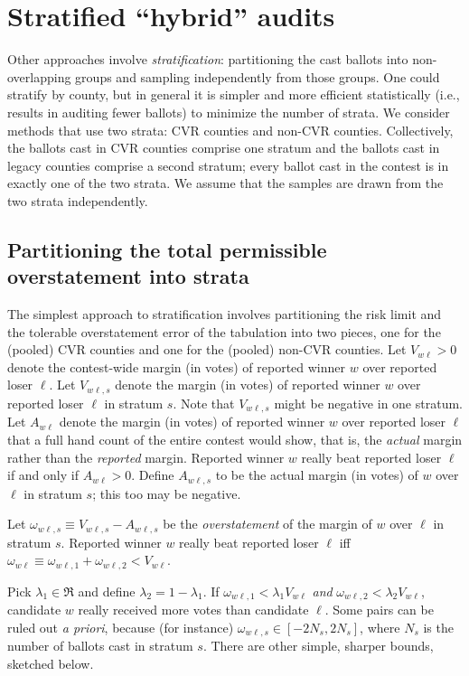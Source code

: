 \documentclass[12pt]{article}
\begin{document}
\section{Stratified ``hybrid'' audits}

Other approaches involve \emph{stratification}: partitioning the cast ballots
into non-overlapping groups and sampling independently from those groups.
One could stratify by county, but in general it is simpler and more efficient
statistically (i.e., results in auditing fewer ballots) to minimize the number of strata.
We consider methods that use two strata: CVR counties and non-CVR counties. 
Collectively, the ballots cast in CVR counties comprise one stratum and the ballots cast in 
legacy counties comprise a second stratum; every ballot cast in the contest is in 
exactly one of the two strata. 
We assume that the samples are drawn from the
two strata independently.

\subsection{Partitioning the total permissible overstatement into strata}
The simplest approach to stratification involves partitioning the risk limit and the tolerable
overstatement error of the tabulation into
two pieces, one for the (pooled) CVR counties and one for the (pooled) non-CVR counties.
Let $V_{w\ell} > 0$ denote the contest-wide margin (in votes) of reported winner 
$w$ over reported loser
$\ell$.
Let $V_{w\ell,s}$ denote the margin (in votes) of reported winner $w$ over reported loser $\ell$
in stratum $s$. 
Note that $V_{w\ell,s}$ might be negative in one stratum.
Let $A_{w\ell}$ denote the margin (in votes)
of reported winner $w$ over reported loser $\ell$ that 
a full hand count of the entire contest would show, that is, the \emph{actual} margin rather
than the \emph{reported} margin.
Reported winner $w$ really beat reported loser $\ell$ if and only if $A_{w\ell} > 0$.
Define $A_{w\ell,s}$ to be the actual margin (in votes) of $w$ over $\ell$ in stratum $s$;
this too may be negative.

Let $\omega_{w\ell,s} \equiv V_{w\ell,s} - A_{w\ell,s}$ be the \emph{overstatement}
of the margin of $w$ over $\ell$ in stratum $s$.
Reported winner $w$ really beat reported loser 
$\ell$ iff $\omega_{w\ell} \equiv \omega_{w\ell,1} + \omega_{w\ell,2} < V_{w\ell}$.

Pick $\lambda_1 \in \Re$ and define $\lambda_2 = 1-\lambda_1$.
If $\omega_{w\ell,1} < \lambda_1 V_{w\ell}$ \emph{and} 
$\omega_{w\ell,2} < \lambda_2 V_{w\ell}$, candidate $w$ really received more votes
than candidate $\ell$.
Some pairs can be ruled out \emph{a priori}, because (for instance) $\omega_{w\ell,s} \in [-2N_s, 2N_s]$,
where $N_s$ is the number of ballots cast in stratum $s$.
There are other simple, sharper bounds, sketched below.
\end{document}
